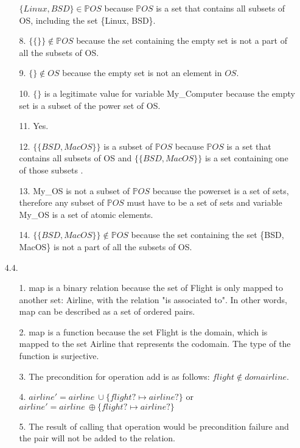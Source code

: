 \documentclass[12pt]{article}
\begin{document}
\begin{enumerate}
\begin{enumerate}
    \noindent $\{Linux, BSD\}\in \mathbb{P}OS$ because $\mathbb{P}OS$ is a set that contains all subsets of OS, including the set \{Linux, BSD\}.
    \item[8.]
    \noindent $\{\{\}\}\notin \mathbb{P}OS$ because the set containing the empty set is not a part of all the subsets of OS.
    \item[9.]
    \noindent $\{\}\notin \mathbb{}OS$ because the empty set is not an element in $\mathbb{}OS$.
    \item[10.]
    \noindent  $\{\}$ is a legitimate value for variable My\_Computer because the empty set is a subset of the power set of OS.
    \item[11.]
    \noindent Yes.
    \item[12.]
    \noindent $\{\{BSD, MacOS\}\}$ is a subset of $\mathbb{P}OS$ because $\mathbb{P}OS$ is a set that contains all subsets of OS and $\{\{BSD, MacOS\}\}$ is a set containing one of those subsets .
    \item[13.]
    \noindent My\_OS is not a subset of $\mathbb{P}OS$ because the powerset is a set of sets, therefore any subset of $\mathbb{P}OS$ must have to be a set of sets and variable My\_OS is a set of atomic elements.
    \item[14.]
    \noindent $\{\{BSD, MacOS\}\}\notin \mathbb{P}OS$ because the set containing the set \{BSD, MacOS\} is not a part of all the subsets of OS.
\end{enumerate}
\item[4.4.]
\begin{enumerate}
    \item[1.]
    \noindent map is a binary relation because the set of Flight is only mapped to another set: Airline, with the relation "is associated to". In other words, map can be described as a set of ordered pairs.
    \item[2.]
    \noindent map is a function because the set Flight is the domain, which is mapped to the set Airline that represents the codomain. The type of the function is surjective.
    \item[3.]
    \noindent The precondition for operation add is as follows: $flight \notin dom airline$.
    \item[4.]
    \noindent $airline' = airline \ \cup \{flight?\mapsto airline?\}$ or $airline' = airline \ \oplus \{flight?\mapsto airline?\}$
    \item[5.]
    \noindent The result of calling that operation would be precondition failure and the pair will not be added to the relation.

\end{enumerate}
\end{enumerate}
\end{document}
